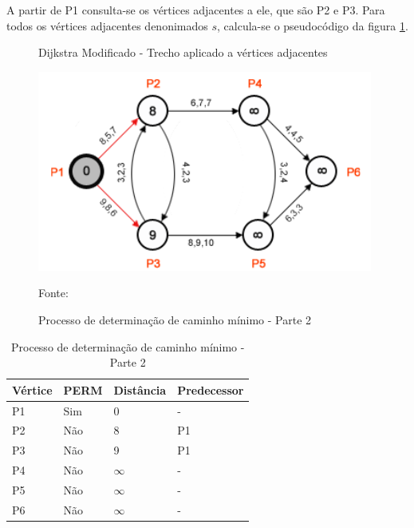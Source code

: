 A partir de P1 consulta-se os vértices adjacentes a ele, que são P2 e P3. Para todos os vértices
adjacentes denonimados $s$, calcula-se o pseudocódigo da figura \ref{fig:diMod}.

\begin{figure}[htbp]
\centering
\caption{Dijkstra Modificado - Trecho aplicado a vértices adjacentes}
\label{fig:diMod}
\end{figure}

\begin{figure}[htbp]
\centering
 \includegraphics[width=.50\textwidth]{chapters/fig/leo3.png}
\caption{Processo de determinação de caminho mínimo - Parte 2}
Fonte: \cite{leonard}
\label{fig:leo3}
\end{figure}
\FloatBarrier
\begin{table}[htbp]
	\centering
	\begin{tabular}{l l l l}
	\toprule
	Vértice & PERM & Distância & Predecessor\\
	\midrule
	P1 & Sim & 0 & - \\
	P2 & Não & 8 & P1 \\
	P3 & Não & 9 & P1 \\
	P4 & Não & $\infty$ & - \\
	P5 & Não & $\infty$ & - \\
	P6 & Não & $\infty$ & - \\
	\bottomrule
	\end{tabular}
\caption{Processo de determinação de caminho mínimo - Parte 2}
 \label{tab:leotab2}
\end{table}

